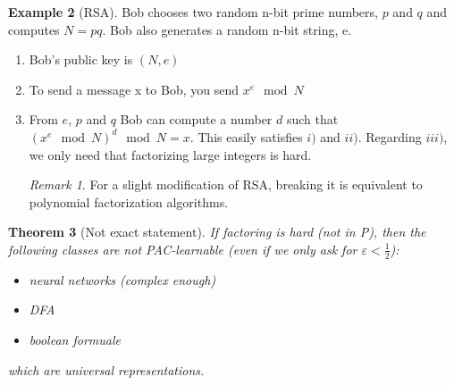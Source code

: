 \documentclass[12pt, letterpaper]{article}
\numberwithin{equation}{section} %
\newcommand{\ve}{\varepsilon}
\newtheorem{theorem}{Theorem}[section]
\theoremstyle{definition}
\newtheorem{example}[theorem]{Example}
\theoremstyle{remark}
\newtheorem{remark}[theorem]{Remark}
\begin{document}
\begin{example}[RSA]
Bob chooses two random n-bit prime numbers, $p$ and $q$ and computes $N=pq$. Bob also generates a random n-bit string, e.
\begin{enumerate}
\item Bob's public key is $(N, e)$
\item To send a message x to Bob, you send $x^e\mod N$
\item From $e$, $p$ and $q$ Bob can compute a number $d$ such that $(x^e \mod N)^d \mod N = x$.
This easily satisfies $i)$ and $ii)$. Regarding $iii)$, we only need that factorizing large integers is hard.
\begin{remark}
For a slight modification of RSA, breaking it is equivalent to polynomial factorization algorithms.
\end{remark}
\end{enumerate}
\end{example}

\begin{theorem}[Not exact statement]
If factoring is hard (not in P), then the following classes are not PAC-learnable (even if we only  ask for $\ve < \frac12$):
\begin{itemize}
\item neural networks (complex enough)
\item DFA
\item boolean formuale
\end{itemize}
which are universal representations.
\end{theorem}
\end{document}
